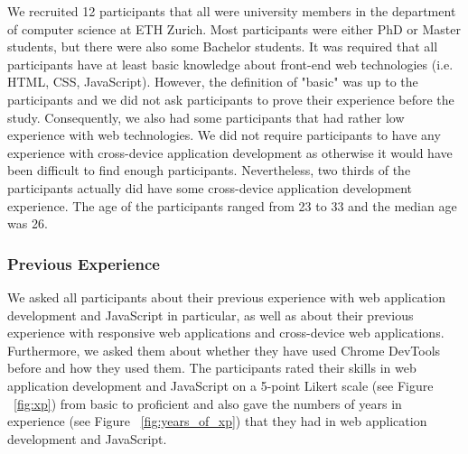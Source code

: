 We recruited 12 participants that all were university members in the department of computer science at ETH Zurich. Most participants were either PhD or Master students, but there were also some Bachelor students. It was required that all participants have at least basic knowledge about front-end web technologies (i.e. HTML, CSS, JavaScript). However, the definition of "basic" was up to the participants and we did not ask participants to prove their experience before the study. Consequently, we also had some participants that had rather low experience with web technologies. We did not require participants to have any experience with cross-device application development as otherwise it would have been difficult to find enough participants. Nevertheless, two thirds of the participants actually did have some cross-device application development experience. The age of the participants ranged from 23 to 33 and the median age was 26. 

\subsubsection{Previous Experience}
We asked all participants about their previous experience with web application development and JavaScript in particular, as well as about their previous experience with responsive web applications and cross-device web applications. Furthermore, we asked them about whether they have used Chrome DevTools before and how they used them. The participants rated their skills in web application development and JavaScript on a 5-point Likert scale (see Figure ~\ref{fig:xp}) from basic to proficient and also gave the numbers of years in experience (see Figure ~\ref{fig:years_of_xp}) that they had in web application development and JavaScript.

